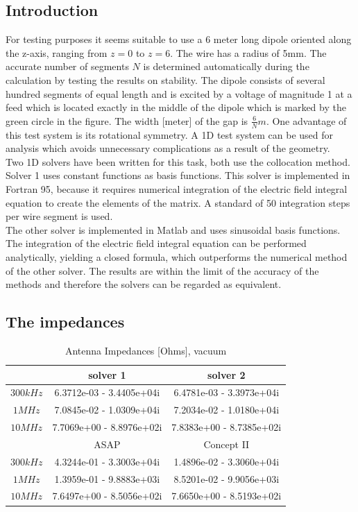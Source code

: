\documentclass[draft,ras]{agutex}
\begin{document}
\begin{article}
\subsection{Introduction}
For testing purposes it seems suitable to use a 6 meter long dipole oriented along the z-axis, ranging from $z=0$ to $z=6$. The wire has a radius of 5mm. The accurate number of segments $N$ is determined automatically during the calculation by testing the results on stability. The dipole consists of several hundred segments of equal length and is excited by a voltage of magnitude 1 at a feed which is located exactly in the middle of the dipole which is marked by the green circle in the figure. The width [meter] of the gap is $\frac{6}{N}m$. One advantage of this test system is its rotational symmetry. A 1D test system can be used for analysis which avoids unnecessary complications as a result of the geometry.\\

Two 1D solvers have been written for this task, both use the collocation method. Solver 1 uses constant functions as basis functions. This solver is implemented in Fortran 95, because it requires numerical integration of the electric field integral equation to create the elements of the matrix. A standard of 50 integration steps per wire segment is used.\\

The other solver is implemented in Matlab and uses sinusoidal basis functions. The integration of the electric field integral equation can be performed analytically, yielding a closed formula, which outperforms the numerical method of the other solver. The results are within the limit of the accuracy of the methods and therefore the solvers can be regarded as equivalent.\\


\subsection{The impedances}
\begin{table}
\caption{Antenna Impedances [Ohms], vacuum}
\label{tab:impedances_vacuum}
\begin{tabular}{|c|c|c|}
 \hline
 & solver 1  & solver 2  \\
\hline
$300 kHz$ & 6.3712e-03 - 3.4405e+04i &  6.4781e-03 - 3.3973e+04i \\
$1 MHz$ & 7.0845e-02 - 1.0309e+04i &  7.2034e-02 - 1.0180e+04i \\
$10 MHz$ &  7.7069e+00 - 8.8976e+02i&  7.8383e+00 - 8.7385e+02i\\
\hline
& ASAP  & Concept II\\
\hline
$300 kHz$ &  4.3244e-01 - 3.3003e+04i &  1.4896e-02 - 3.3060e+04i\\
$1 MHz$ & 1.3959e-01 - 9.8883e+03i &  8.5201e-02 - 9.9056e+03i\\
$10 MHz$ &    7.6497e+00 - 8.5056e+02i&  7.6650e+00 - 8.5193e+02i\\
\hline
\end{tabular}
\end{table}





\end{article}
\end{document}
